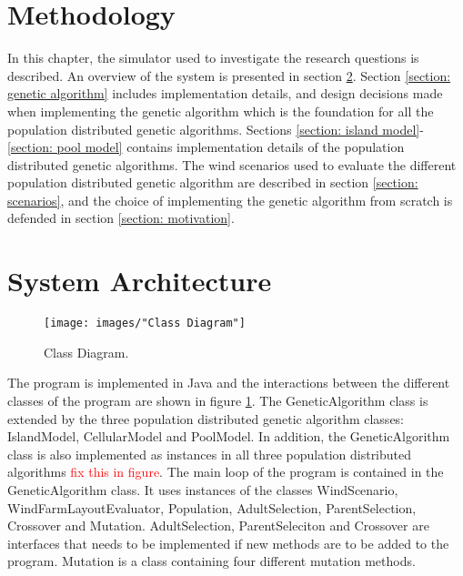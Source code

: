 \documentclass{article}
\begin{document}
\section{Methodology}\label{chapter:methodology}%


In this chapter, the simulator used to investigate the research questions is described. An overview of the system is presented in section \ref{section:systemt architecture}. Section \ref{section: genetic algorithm} includes implementation details, and design decisions made when implementing the genetic algorithm which is the foundation for all the population distributed genetic algorithms. Sections \ref{section: island model}-\ref{section: pool model} contains implementation details of the population distributed genetic algorithms. The wind scenarios used to evaluate the different population distributed genetic algorithm are described in section \ref{section: scenarios}, and the choice of implementing the genetic algorithm from scratch is defended in section \ref{section: motivation}.


\section{System Architecture}\label{section:systemt architecture}


\begin{figure}[h!]
\begin{center}
\texttt{[image: images/"Class Diagram"]}
\caption{Class Diagram.}
\label{figure:class diagram}
\end{center}
\end{figure}


The program is implemented in Java and the interactions between the different classes of the program are shown in figure \ref{figure:class diagram}. The GeneticAlgorithm class is extended by the three population distributed genetic algorithm classes: IslandModel, CellularModel and PoolModel. In addition, the GeneticAlgorithm class is also implemented as instances in all three population distributed algorithms \textcolor{red}{fix this in figure}. The main loop of the program is contained in the GeneticAlgorithm class. It uses instances of the classes WindScenario, WindFarmLayoutEvaluator, Population, AdultSelection, ParentSelection, Crossover and Mutation. AdultSelection, ParentSeleciton and Crossover are interfaces that needs to be implemented if new methods are to be added to the program. Mutation is a class containing four different mutation methods. 
\end{document}
